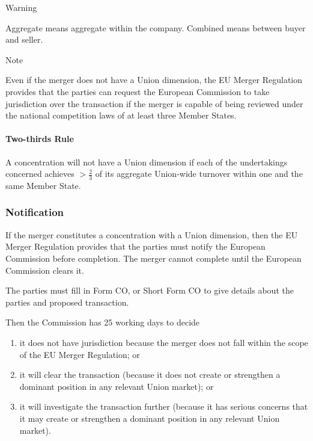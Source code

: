 \documentclass[
]{article}
\providecommand{\tightlist}{%
  \setlength{\itemsep}{0pt}\setlength{\parskip}{0pt}}
\newenvironment{env-50f656db-1019-4ecb-abbd-eb2993c53735}
{
    \savenotes\tcolorbox[blanker,breakable,left=5pt,borderline west={2pt}{-4pt}{blue}]
}
{
    \endtcolorbox\spewnotes
}
\newenvironment{env-5999e3fc-f9e7-4987-a721-954eb3613a6f}
{
    \savenotes\tcolorbox[blanker,breakable,left=5pt,borderline west={2pt}{-4pt}{orange}]
}
{
    \endtcolorbox\spewnotes
}
\begin{document}
\begin{env-5999e3fc-f9e7-4987-a721-954eb3613a6f}

Warning

Aggregate means aggregate within the company. Combined means between
buyer and seller.

\end{env-5999e3fc-f9e7-4987-a721-954eb3613a6f}

\begin{env-50f656db-1019-4ecb-abbd-eb2993c53735}

Note

Even if the merger does not have a Union dimension, the EU Merger
Regulation provides that the parties can request the European Commission
to take jurisdiction over the transaction if the merger is capable of
being reviewed under the national competition laws of at least three
Member States.

\end{env-50f656db-1019-4ecb-abbd-eb2993c53735}

\hypertarget{two-thirds-rule}{%
\paragraph{Two-thirds Rule}\label{two-thirds-rule}}

A concentration will not have a Union dimension if each of the
undertakings concerned achieves {\(> \frac{2}{3}\)} of its aggregate
Union-wide turnover within one and the same Member State.

\hypertarget{notification}{%
\subsubsection{Notification}\label{notification}}

If the merger constitutes a concentration with a Union dimension, then
the EU Merger Regulation provides that the parties must notify the
European Commission before completion. The merger cannot complete until
the European Commission clears it.

The parties must fill in Form CO, or Short Form CO to give details about
the parties and proposed transaction.

Then the Commission has 25 working days to decide

\begin{enumerate}
\tightlist
\item
  it does not have jurisdiction because the merger does not fall within
  the scope of the EU Merger Regulation; or
\item
  it will clear the transaction (because it does not create or
  strengthen a dominant position in any relevant Union market); or
\item
  it will investigate the transaction further (because it has serious
  concerns that it may create or strengthen a dominant position in any
  relevant Union market).
\end{enumerate}
\end{document}
